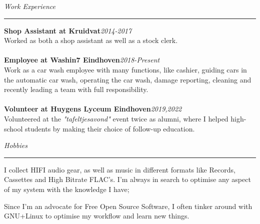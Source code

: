 \documentclass[12pt]{article}
\begin{document}
\textit{\huge{Work Experience}} \\
\noindent\hfil\rule{\textwidth}{.4pt}\hfil

\textbf{Shop Assistant at Kruidvat}\hfill \textit{2014-2017}\\
Worked as both a shop assistant as well as a stock clerk.\\
\hfill\\
\textbf{Employee at Washin7 Eindhoven}\hfill \textit{2018-Present}\\
Work as a car wash employee with many functions, like cashier, guiding cars in the automatic car wash, operating the car wash, damage reporting, cleaning and recently leading a team with full responsibility.\\
\hfill\\
\textbf{Volunteer at Huygens Lyceum Eindhoven}\hfill \textit{2019,2022}\\
Volunteered at the \textit{"tafeltjesavond"} event twice as alumni, where I helped high-school students by making their choice of follow-up education.
\vspace{0.5cm}

\newpage
\textit{\huge{Hobbies}} \\
\noindent\hfil\rule{\textwidth}{.4pt}\hfill
\begin{compactitem}
    \item I collect HIFI audio gear, as well as music in different formats like Records, Cassettes and High Bitrate FLAC's. I'm always in search to optimise any aspect of my system with the knowledge I have;
    \item Since I'm an advocate for Free Open Source Software, I often tinker around with GNU+Linux to optimise my workflow and learn new things.
\end{compactitem}
\end{document}
